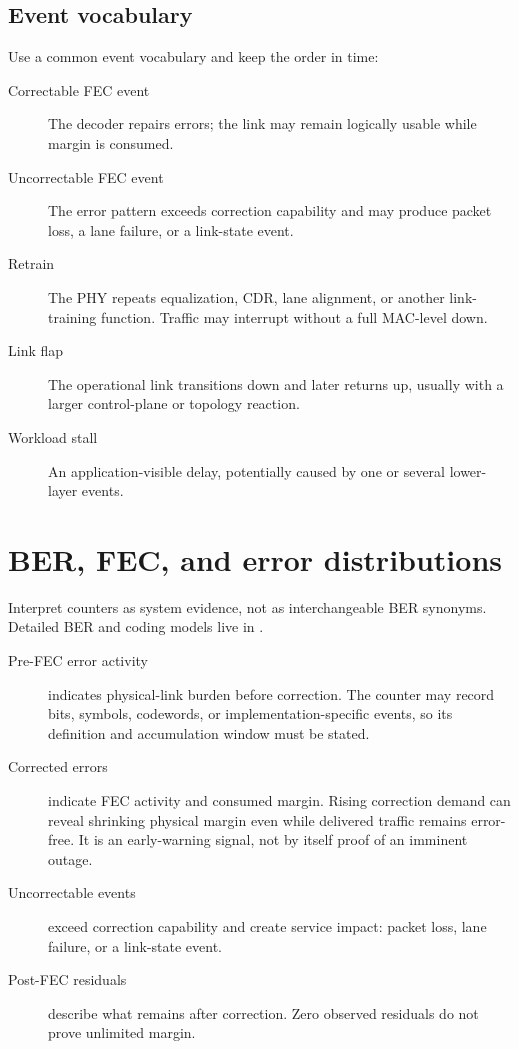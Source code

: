\subsection{Event vocabulary}
\label{sec:networking-event-vocab}

Use a common event vocabulary and keep the order in time:

\begin{description}
\item[Correctable FEC event] The decoder repairs errors; the link may remain
      logically usable while margin is consumed.
\item[Uncorrectable FEC event] The error pattern exceeds correction capability
      and may produce packet loss, a lane failure, or a link-state event.
\item[Retrain] The PHY repeats equalization, CDR, lane alignment, or another
      link-training function. Traffic may interrupt without a full MAC-level
      down.
\item[Link flap] The operational link transitions down and later returns up,
      usually with a larger control-plane or topology reaction.
\item[Workload stall] An application-visible delay, potentially caused by one
      or several lower-layer events.
\end{description}


\section{BER, FEC, and error distributions}
\label{sec:fec-symbol-histogram}

Interpret counters as system evidence, not as interchangeable BER synonyms.
Detailed BER and coding models live in .

\begin{description}
\item[Pre-FEC error activity]
      indicates physical-link burden before correction. The counter may record
      bits, symbols, codewords, or implementation-specific events, so its
      definition and accumulation window must be stated.
\item[Corrected errors]
      indicate FEC activity and consumed margin. Rising correction demand can
      reveal shrinking physical margin even while delivered traffic remains
      error-free. It is an early-warning signal, not by itself proof of an
      imminent outage.
\item[Uncorrectable events]
      exceed correction capability and create service impact: packet loss, lane
      failure, or a link-state event.
\item[Post-FEC residuals]
      describe what remains after correction. Zero observed residuals do not
      prove unlimited margin.
\end{description}

